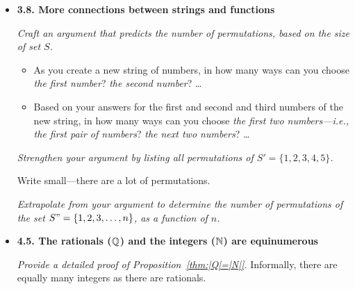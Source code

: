 


\begin{itemize}
\item
{\bf 3.8. More connections between strings and functions}
\medskip

{\em Craft an argument that predicts the number of permutations, based on the size of set $S$.}
\smallskip

\begin{itemize}
\item
As you create a new string of numbers, in how many ways can you choose {\em the first number}? 
{\em the second number}? \ldots
\item
Based on your answers for the first and second and third numbers of the new string, 
in how many ways can you choose {\em the first two numbers---i.e., the first {\em pair} of numbers}? 
{\em the next two numbers}? \ldots
\end{itemize}

{\em Strengthen your argument by listing all permutations of  $S' =  \{1,2,3,4,5\}$.}

\smallskip

Write small---there are a lot of permutations.

{\em Extrapolate from your argument to determine the number of permutations of the set 
$S" =  \{1,2,3, \ldots, n\}$, as a function of $n$.}

\end{itemize}



\begin{itemize}
\item
{\bf 4.5. The rationals ($\mathbb{Q}$) and the integers ($\mathbb{N}$) are equinumerous}
\smallskip

{\em Provide a {\em detailed} proof of Proposition~\ref{thm:|Q|=|N|}.}  
Informally, there are equally many integers as there are rationals.

\end{itemize}




